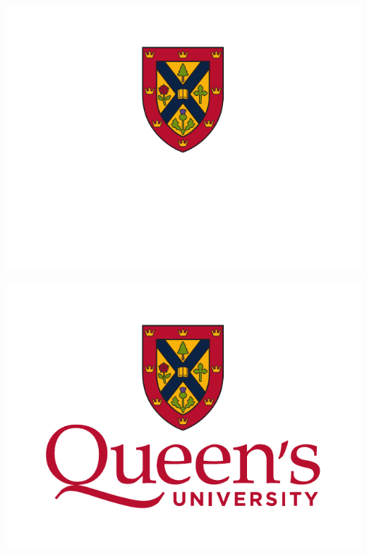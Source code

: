 \documentclass[fleqn]{qu-slides}
\begin{document}
\SlideRed
\begin{frame}
    \centering
    \includegraphics[height=0.9\textheight]{logo/qu-logo-vertical-reverse.pdf}
\end{frame}


\SlideGrey
\begin{frame}
    \centering
    \includegraphics[height=0.9\textheight]{logo/qu-logo-vertical-colour.pdf}
\end{frame}

\end{document}
